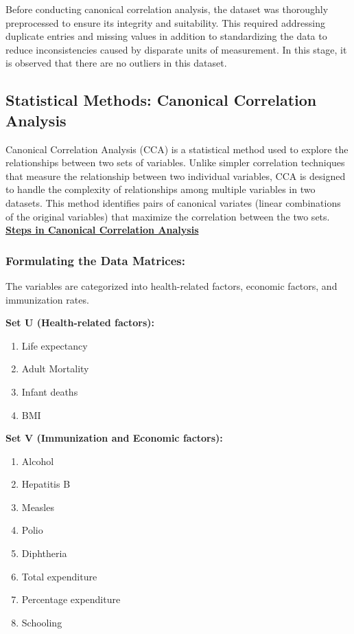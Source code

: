 \documentclass[11pt]{article}
\begin{document}
		Before conducting canonical correlation analysis, the dataset was thoroughly preprocessed to ensure its integrity and suitability. This required addressing duplicate entries and missing values in addition to standardizing the data to reduce inconsistencies caused by disparate units of measurement. In this stage, it is observed that there are no outliers in this dataset. 
		
			\subsection{Statistical Methods: Canonical Correlation Analysis}
			
			Canonical Correlation Analysis (CCA) is a statistical method used to explore the relationships between two sets of variables. Unlike simpler correlation techniques that measure the relationship between two individual variables, CCA is designed to handle the complexity of relationships among multiple variables in two datasets. This method identifies pairs of canonical variates (linear combinations of the original variables) that maximize the correlation between the two sets.\\

			\textbf{\underline{Steps in Canonical Correlation Analysis}}
		
			\subsubsection{Formulating the Data Matrices:}
			The variables are categorized into health-related factors, economic factors, and immunization rates.
			
			\textbf{Set U (Health-related factors):}
			\begin{enumerate}
				\item Life expectancy
				\item Adult Mortality
				\item Infant deaths
				\item BMI
			\end{enumerate}
			
			\textbf{Set V (Immunization and Economic factors):}
			
			\begin{enumerate}
				\item Alcohol
				\item Hepatitis B
				\item Measles
				\item Polio
				\item Diphtheria
				\item Total expenditure
				\item Percentage expenditure
				\item Schooling
			\end{enumerate}
			
\end{document}
